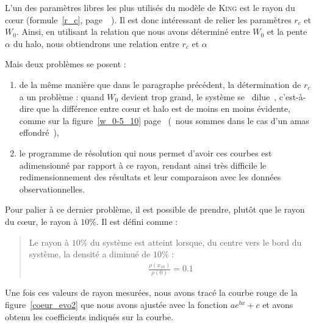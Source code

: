 	L'un des paramètres libres les plus utilisés du modèle de \textsc{King} est le rayon du cœur (formule~\ref{r_c}, page~\pageref{r_c}~).
	Il est donc intéressant de relier les paramètres $r_c$ et $W_0$. Ainsi, en utilisant la relation que nous avons déterminé entre $W_0$ et la pente $\alpha$ du halo, nous obtiendrons une relation entre $r_c$ et $\alpha$

	Mais deux problèmes se posent :
	\begin{enumerate}
		\item de la même manière que dans le paragraphe précédent, la détermination de $r_c$ a un problème : quand
	$W_0$ devient trop grand, le système se \og~dilue~\fg, c'est-à-dire que la différence entre
	cœur et halo est de moins en moins évidente, comme sur la figure~\ref{w_0-5_10}
	page~\pageref{w_0-5_10} (~nous sommes dans le cas d'un amas effondré~),
		\item le programme de résolution qui nous permet d'avoir ces courbes est adimensionné par rapport à ce rayon, rendant ainsi très difficile
			le redimensionnement des résultats et leur comparaison avec les données observationnelles.
	\end{enumerate}

	Pour palier à ce dernier problème, il est possible de prendre, plutôt que le rayon du cœur, le rayon à $10\%$.
	Il est défini comme :
	\begin{quote}
		Le rayon à $10\%$ du système est atteint lorsque, du centre vers le bord du
		système, la densité a diminué de $10\%$ :
		\begin{align}
			\frac{\rho(x_{10})}{\rho(0)} = 0.1
		\end{align}
	\end{quote}


	Une fois ces valeurs de rayon mesurées, nous avons tracé la courbe rouge de la
	figure~\ref{coeur_evo2} que nous avons ajustée avec la fonction $a e^{b x} + c$ et avons
	obtenu les coefficients indiqués sur la courbe.

